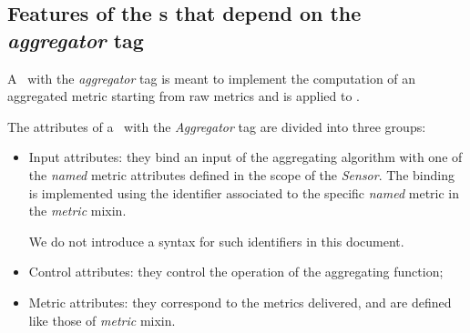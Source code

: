 \documentclass[10pt,a4paper]{article}
\begin{document}

\newcommand{\attrname}[1]{}
\attrname{metric and control}

\subsection{Features of the \mi s that depend on the {\em aggregator} tag \label{sec:Aggregator}}

A \mi\ with the {\em aggregator} tag is meant to implement the computation of an aggregated metric starting from raw metrics and is applied to \sens.
 


The attributes of a \mi\ with the {\em Aggregator} tag are divided into three groups:

\begin{itemize}

\item Input attributes: they bind an input of the aggregating algorithm with one of the {\em named} metric attributes defined in the scope of the {\em Sensor}. The binding is implemented using the identifier associated to the specific {\em named} metric in the {\em metric} mixin. 

We do not introduce a syntax for such identifiers in this document.

\item Control attributes: they control the operation of the aggregating function;

\item Metric attributes: they correspond to the metrics delivered, and are defined like those of {\em metric} mixin.
\end{itemize}
\end{document}
